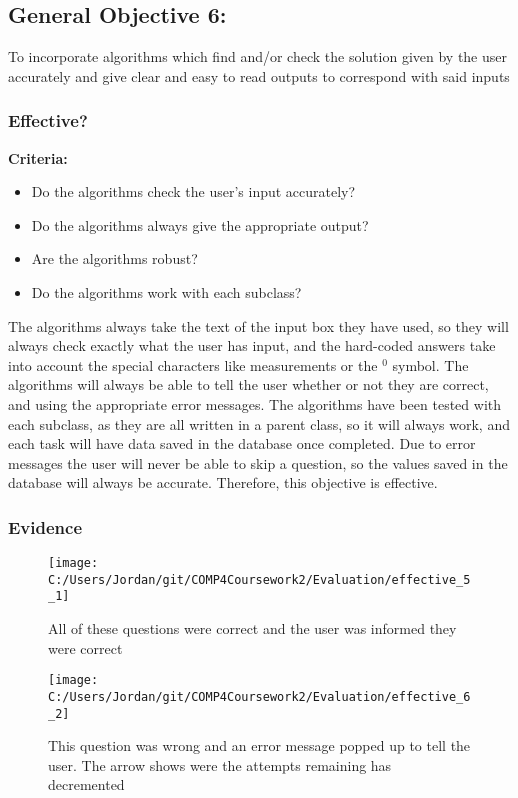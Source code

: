 \subsection{General Objective 6: }

To incorporate algorithms which find and/or check the solution given by the user accurately and give clear and easy to read outputs to correspond with said inputs

\subsubsection{Effective?}

\textbf{Criteria: }

\begin{itemize}
	\item Do the algorithms check the user's input accurately?
	\item Do the algorithms always give the appropriate output?
	\item Are the algorithms robust?
	\item Do the algorithms work with each subclass?
\end{itemize}

The algorithms always take the text of the input box they have used, so they will always check exactly what the user has input, and the hard-coded answers take into account the special characters like measurements or the {$^0$} symbol. The algorithms will always be able to tell the user whether or not they are correct, and using the appropriate error messages. The algorithms have been tested with each subclass, as they are all written in a parent class, so it will always work, and each task will have data saved in the database once completed. Due to error messages the user will never be able to skip a question, so the values saved in the database will always be accurate. Therefore, this objective is effective.

\subsubsection{Evidence}

\begin{figure}[H]
	\texttt{[image: C:/Users/Jordan/git/COMP4Coursework2/Evaluation/effective\_5\_1]}
	\caption{All of these questions were correct and the user was informed they were correct}
\end{figure}

\begin{figure}[H]
	\texttt{[image: C:/Users/Jordan/git/COMP4Coursework2/Evaluation/effective\_6\_2]}
	\caption{This question was wrong and an error message popped up to tell the user. The arrow shows were the attempts remaining has decremented}
\end{figure}

